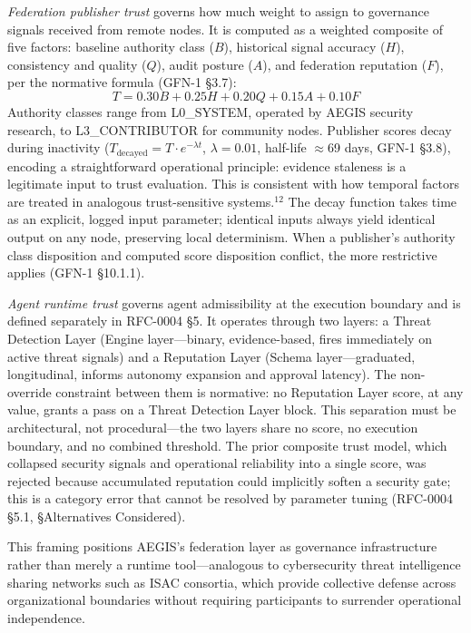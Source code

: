 \documentclass{IEEEcsmag}
\begin{document}
{\it Federation publisher trust} governs how much weight to assign to governance signals received from remote nodes. It is computed as a weighted composite of five factors: baseline authority class ($B$), historical signal accuracy ($H$), consistency and quality ($Q$), audit posture ($A$), and federation reputation ($F$), per the normative formula (GFN-1 \S3.7):
\[T = 0.30B + 0.25H + 0.20Q + 0.15A + 0.10F\] Authority classes range from L0\_SYSTEM, operated by AEGIS security research, to L3\_CONTRIBUTOR for community nodes. Publisher scores decay during inactivity ($T_{\text{decayed}} = T \cdot e^{-\lambda t}$, $\lambda=0.01$, half-life $\approx$69 days, GFN-1 \S3.8), encoding a straightforward operational principle: evidence staleness is a legitimate input to trust evaluation. This is consistent with how temporal factors are treated in analogous trust-sensitive systems.$^{12}$ The decay function takes time as an explicit, logged input parameter; identical inputs always yield identical output on any node, preserving local determinism. When a publisher's authority class disposition and computed score disposition conflict, the more restrictive applies (GFN-1 \S10.1.1).

{\it Agent runtime trust} governs agent admissibility at the execution boundary and is defined separately in RFC-0004 \S5. It operates through two layers: a Threat Detection Layer (Engine layer---binary, evidence-based, fires immediately on active threat signals) and a Reputation Layer (Schema layer---graduated, longitudinal, informs autonomy expansion and approval latency). The non-override constraint between them is normative: no Reputation Layer score, at any value, grants a pass on a Threat Detection Layer block. This separation must be architectural, not procedural---the two layers share no score, no execution boundary, and no combined threshold. The prior composite trust model, which collapsed security signals and operational reliability into a single score, was rejected because accumulated reputation could implicitly soften a security gate; this is a category error that cannot be resolved by parameter tuning (RFC-0004 \S5.1, \S Alternatives Considered).

This framing positions AEGIS's federation layer as governance infrastructure rather than merely a runtime tool---analogous to cybersecurity threat intelligence sharing networks such as ISAC consortia, which provide collective defense across organizational boundaries without requiring participants to surrender operational independence.
\end{document}
